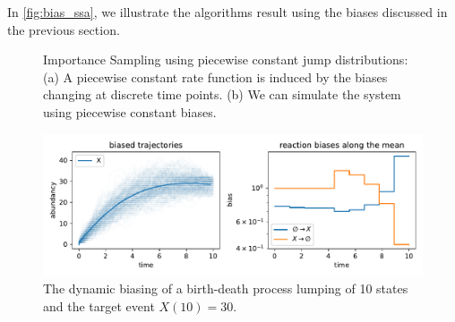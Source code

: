 In \autoref{fig:bias_ssa}, we illustrate the algorithms result using the biases discussed in the previous section.
\begin{figure}
    \centering
    \caption[Bias interpolation \& biased \ac{SSA}]{\label{fig:bias_ssa}}
    \caption[Importance Sampling using piecewise constant jump distributions]{Importance Sampling using piecewise constant jump distributions: (a) A piecewise constant rate function is induced by the biases changing at discrete time points. (b) We can simulate the system using piecewise constant biases.}
\end{figure}


\begin{figure}[htb]
    \centering
    \includegraphics[width=\textwidth]{gfx/bd_is.pdf}
    \caption[Dynamic biasing for the Poisson process]{\label{fig:bd_rare}The dynamic biasing of a birth-death process lumping of \num{10} states and the target event $X(10)=30$.}
\end{figure}
